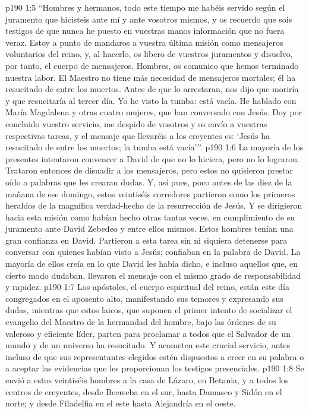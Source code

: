 \vs p190 1:5 \pc “Hombres y hermanos, todo este tiempo me habéis servido según el juramento que hicisteis ante mí y ante vosotros mismos, y os recuerdo que sois testigos de que nunca he puesto en vuestras manos información que no fuera veraz. Estoy a punto de mandaros a vuestra última misión como mensajeros voluntarios del reino, y, al hacerlo, os libero de vuestros juramentos y disuelvo, por tanto, el cuerpo de mensajeros. Hombres, os comunico que hemos terminado nuestra labor. El Maestro no tiene más necesidad de mensajeros mortales; él ha resucitado de entre los muertos. Antes de que lo arrestaran, nos dijo que moriría y que resucitaría al tercer día. Yo he visto la tumba: está vacía. He hablado con María Magdalena y otras cuatro mujeres, que han conversado con Jesús. Doy por concluido vuestro servicio, me despido de vosotros y os envío a vuestras respectivas tareas, y el mensaje que llevaréis a los creyentes es: ‘Jesús ha resucitado de entre los muertos; la tumba está vacía’”.
\vs p190 1:6 \pc La mayoría de los presentes intentaron convencer a David de que no lo hiciera, pero no lo lograron. Trataron entonces de disuadir a los mensajeros, pero estos no quisieron prestar oído a palabras que les crearan dudas. Y, así pues, poco antes de las diez de la mañana de ese domingo, estos veintiséis corredores partieron como los primeros heraldos de la magnífica verdad\hyp{}hecho de la resurrección de Jesús. Y se dirigieron hacia esta misión como habían hecho otras tantas veces, en cumplimiento de su juramento ante David Zebedeo y entre ellos mismos. Estos hombres tenían una gran confianza en David. Partieron a esta tarea sin ni siquiera detenerse para conversar con quienes habían visto a Jesús; confiaban en la palabra de David. La mayoría de ellos creía en lo que David les había dicho, e incluso aquellos que, en cierto modo dudaban, llevaron el mensaje con el mismo grado de responsabilidad y rapidez.
\vs p190 1:7 \pc Los apóstoles, el cuerpo espiritual del reino, están este día congregados en el aposento alto, manifestando sus temores y expresando sus dudas, mientras que estos laicos, que suponen el primer intento de socializar el evangelio del Maestro de la hermandad del hombre, bajo las órdenes de su valeroso y eficiente líder, parten para proclamar a todos que el Salvador de un mundo y de un universo ha resucitado. Y acometen este crucial servicio, antes incluso de que sus representantes elegidos estén dispuestos a creer en su palabra o a aceptar las evidencias que les proporcionan los testigos presenciales.
\vs p190 1:8 \pc Se envió a estos veintiséis hombres a la casa de Lázaro, en Betania, y a todos los centros de creyentes, desde Beerseba en el sur, hasta Damasco y Sidón en el norte; y desde Filadelfia en el este hasta Alejandría en el oeste.
